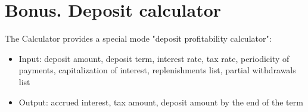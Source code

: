 \documentclass{article}
\begin{document}
\section{Bonus. Deposit calculator}
The Calculator provides a special mode "deposit profitability calculator":
  \begin{itemize}
    \item Input: deposit amount, deposit term, interest rate, tax rate, periodicity of payments, capitalization of interest, replenishments list, partial withdrawals list
    \item Output: accrued interest, tax amount, deposit amount by the end of the term
  \end{itemize}
  
\end{document}

